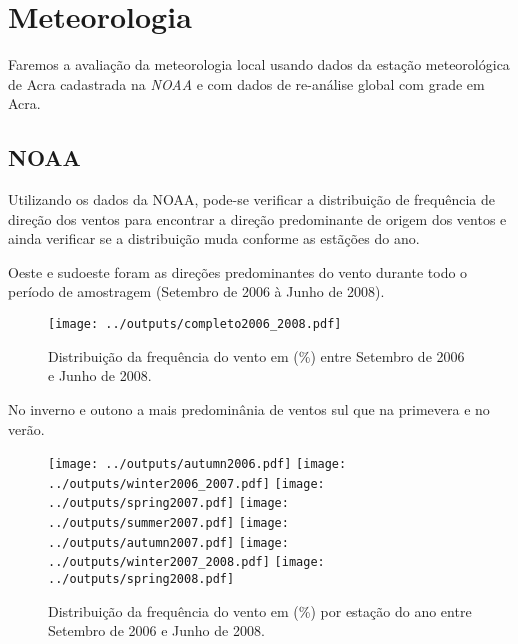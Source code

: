 \section{Meteorologia}

Faremos a avaliação da meteorologia local usando dados da estação meteorológica
de Acra cadastrada na \textit{NOAA} e com dados de re-análise global com grade
em Acra. 

\subsection{NOAA}
Utilizando os dados da NOAA, pode-se verificar a distribuição de frequência de
direção dos ventos para encontrar a direção predominante de origem dos ventos e 
ainda verificar se a distribuição muda conforme as estãções do ano.  


Oeste e sudoeste foram as direções predominantes do vento durante todo o período 
de amostragem (Setembro de 2006 à Junho de 2008).
 
\begin{figure}[H]
\begin{center}
  \texttt{[image: ../outputs/completo2006\_2008.pdf]}
  \caption{Distribuição da frequência do vento em (\%) entre
           Setembro de 2006 e Junho de 2008.}
\end{center}
\end{figure}


No inverno e outono a mais predominânia de ventos sul que na primevera 
e no verão. 

\begin{figure}[H]
\begin{center}
  \texttt{[image: ../outputs/autumn2006.pdf]}
  \texttt{[image: ../outputs/winter2006\_2007.pdf]}
  \texttt{[image: ../outputs/spring2007.pdf]}
  \texttt{[image: ../outputs/summer2007.pdf]}
  \texttt{[image: ../outputs/autumn2007.pdf]}
  \texttt{[image: ../outputs/winter2007\_2008.pdf]}
  \texttt{[image: ../outputs/spring2008.pdf]}
\end{center}
\caption{Distribuição da frequência do vento em (\%) por estação do ano entre
         Setembro de 2006 e Junho de 2008.}
\end{figure}


